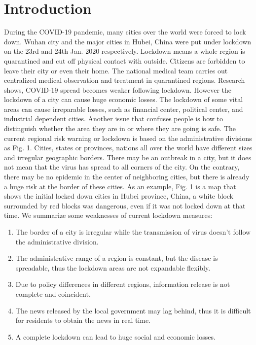 \documentclass[conference]{IEEEtran}
\begin{document}
\IEEEpeerreviewmaketitle

\section{Introduction}
During the COVID-19\cite{hu2020characteristics} pandemic, many cities over the world were forced to lock down.
Wuhan city and the major cities in Hubei, China were put under lockdown on the 23rd and 24th Jan. 2020 respectively\cite{lau2020positive}.
Lockdown means a whole region is quarantined and cut off physical contact with outside.
Citizens are forbidden to leave their city or even their home.
The national medical team carries out centralized medical observation and treatment in quarantined regions.
Research shows, COVID-19 spread becomes weaker following lockdown\cite{lau2020positive}.
However the lockdown of a city can cause huge economic losses.
The lockdown of some vital areas can cause irreparable losses, such as financial center, political center, and industrial dependent cities.
Another issue that confuses people is how to distinguish whether the area they are in or where they are going is safe.
The current regional risk warning or lockdown is based on the administrative divisions as Fig. 1.
Cities, states or provinces, nations all over the world have different sizes and irregular geographic borders.
There may be an outbreak in a city, but it does not mean that the virus has spread to all corners of the city.
On the contrary, there may be no epidemic in the center of neighboring cities, but there is already a huge risk at the border of these cities.
As an example, Fig. 1 is a map that shows the initial locked down cities in Hubei province, China, a white block surrounded by red blocks was dangerous, even if it was not locked down at that time.
We summarize some weaknesses of current lockdown measures:
\begin{enumerate}
    \item The border of a city is irregular while the transmission of virus doesn't follow the administrative division.
    \item The administrative range of a region is constant, but the disease is spreadable, thus the lockdown areas are not expandable flexibly.
    \item Due to policy differences in different regions, information release is not complete and coincident.
    \item The news released by the local government may lag behind, thus it is difficult for residents to obtain the news in real time.
    \item A complete lockdown can lead to huge social and economic losses.
\end{enumerate}
\end{document}
